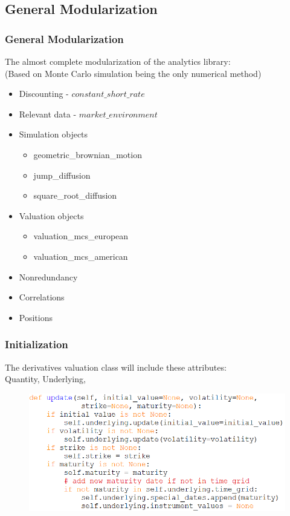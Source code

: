 \documentclass{beamer}
\begin{document}
\subsection{General Modularization}

\begin{frame}
\frametitle{General Modularization}
The almost complete modularization of the analytics library:\\
(Based on Monte Carlo simulation being the only numerical method)
\begin{itemize}
	\item Discounting - $constant\_short\_rate$
	\item Relevant data - $market\_environment$
	\item Simulation objects
	\begin{itemize}
		\item geometric\_brownian\_motion
		\item jump\_diffusion
		\item square\_root\_diffusion
	\end{itemize}
	\item Valuation objects
	\begin{itemize}
		\item valuation\_mcs\_european
		\item valuation\_mcs\_american
	\end{itemize}
	\item Nonredundancy
	\item Correlations
	\item Positions
\end{itemize}
\end{frame}

\begin{frame}
\frametitle{Initialization}
The derivatives valuation class will include these attributes:\\
Quantity, Underlying, 
\begin{figure}[H]
	\includegraphics[scale=0.5]{update_valuation_class.png}
\end{figure}
\end{frame}
\end{document}
